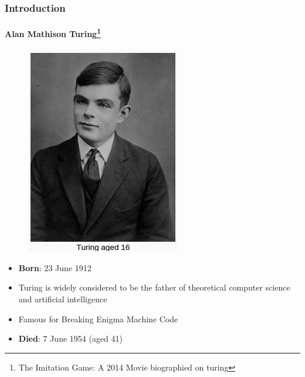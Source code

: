 \documentclass[hyperref={pdfpagelabels=true}]{beamer}
\begin{document}
\begin{frame}
\frametitle{Introduction}
\framesubtitle{Alan Mathison Turing\footnote{The Imitation Game: A 2014 Movie biographied on turing}}
\begin{figure}[!tbp]
\centering
\includegraphics[scale = 0.35]{figs/alan.png}
\end{figure}
\begin{itemize}
\item {\bf Born}: 23 June 1912
\item Turing is widely considered to be the father of theoretical computer science and artificial intelligence
\item Famous for Breaking Enigma Machine Code
\item {\bf Died}: 7 June 1954 (aged 41)
\end{itemize}
\end{frame}
\end{document}
